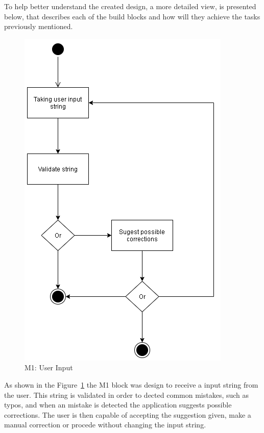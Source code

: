 To help better understand the created design, a more detailed view, is presented below, that describes each of the build blocks and how will they achieve the tasks previously mentioned.

\begin{figure}[H]
\centering
\includegraphics[scale=0.5]{ch4/assets/M1.png}
\caption[User Input Module]{M1: User Input}
\label{fig:M1}
\end{figure}

As shown in the Figure~\ref{fig:M1} the M1 block was design to receive a input string from the user.
This string is validated in order to dected common mistakes, such as typos, and when an mistake is detected the application suggests possible corrections.
The user is then capable of accepting the suggestion given, make a manual correction or procede without changing the input string.

